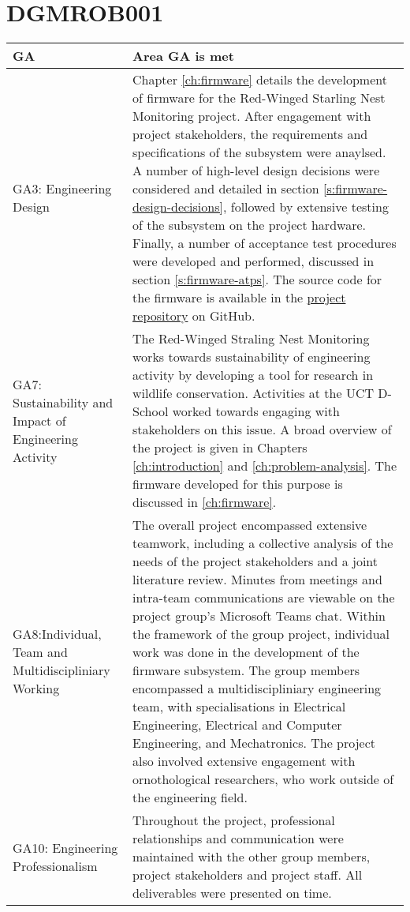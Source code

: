 \documentclass[class=report,11pt,crop=false]{standalone}
\begin{document}
\section{DGMROB001}

\centering
\begin{tabularx}{\textwidth}{|p{} X|}

    \hline
    \textbf{GA}  & \textbf{Area GA is met} \\ \hline

    GA3: Engineering Design & Chapter \ref{ch:firmware} details the development of firmware for the Red-Winged Starling Nest Monitoring project. After engagement with project stakeholders, the requirements and specifications of the subsystem were anaylsed. A number of high-level design decisions were considered and detailed in section \ref{s:firmware-design-decisions}, followed by extensive testing of the subsystem on the project hardware. Finally, a number of acceptance test procedures were developed and performed, discussed in section \ref{s:firmware-atps}. The source code for the firmware is available in the \href{https://github.com/rothdu/EEE4113F-Group13-2024}{project repository} on GitHub. \\ \hline

    GA7: Sustainability and Impact of Engineering Activity & The Red-Winged Straling Nest Monitoring works towards sustainability of engineering activity by developing a tool for research in wildlife conservation. Activities at the UCT D-School worked towards engaging with stakeholders on this issue. A broad overview of the project is given in Chapters \ref{ch:introduction} and \ref{ch:problem-analysis}. The firmware developed for this purpose is discussed in \ref{ch:firmware}.\\ \hline

    GA8:Individual, Team and Multidiscipliniary Working & The overall project encompassed extensive teamwork, including a collective analysis of the needs of the project stakeholders and a joint literature review. Minutes from meetings and intra-team communications are viewable on the project group's Microsoft Teams chat. Within the framework of the group project, individual work was done in the development of the firmware subsystem. The group members encompassed a multidiscipliniary engineering team, with specialisations in Electrical Engineering, Electrical and Computer Engineering, and Mechatronics. The project also involved extensive engagement with ornothological researchers, who work outside of the engineering field. \\ \hline

    GA10: Engineering Professionalism & Throughout the project, professional relationships and communication were maintained with the other group members, project stakeholders and project staff. All deliverables were presented on time. \\ \hline


\end{tabularx}
\raggedright


\ifstandalone

\printnoidxglossary[type=\acronymtype,nonumberlist]
\fi
\end{document}
